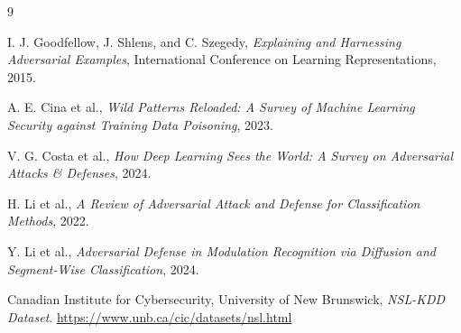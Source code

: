 \documentclass[11pt]{article}
\begin{document}
\newpage
\begin{thebibliography}{9}

I. J. Goodfellow, J. Shlens, and C. Szegedy,
\textit{Explaining and Harnessing Adversarial Examples},
International Conference on Learning Representations, 2015.

A. E. Cina et al.,
\textit{Wild Patterns Reloaded: A Survey of Machine Learning Security against Training Data Poisoning},
2023.

V. G. Costa et al.,
\textit{How Deep Learning Sees the World: A Survey on Adversarial Attacks \& Defenses},
2024.

H. Li et al.,
\textit{A Review of Adversarial Attack and Defense for Classification Methods},
2022.

Y. Li et al.,
\textit{Adversarial Defense in Modulation Recognition via Diffusion and Segment-Wise Classification},
2024.

Canadian Institute for Cybersecurity, University of New Brunswick,
\textit{NSL-KDD Dataset}.
\url{https://www.unb.ca/cic/datasets/nsl.html}

\end{thebibliography}
\end{document}
